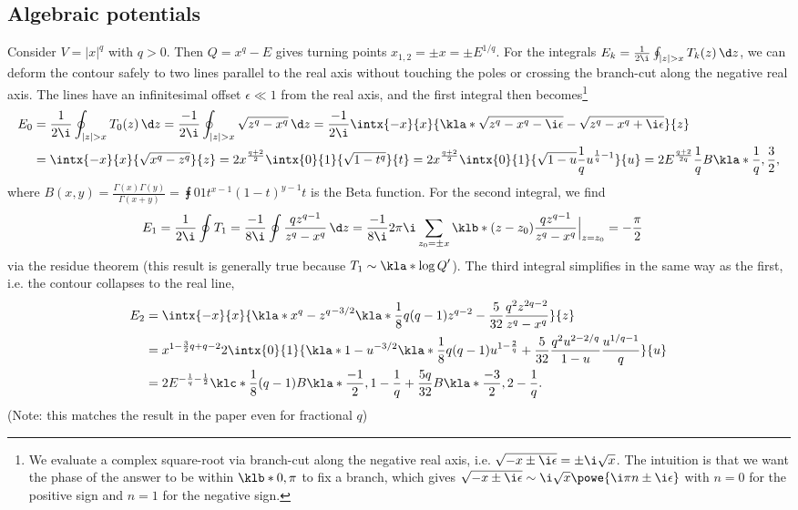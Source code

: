 \documentclass[english, parskip=full]{scrartcl}
\begin{document}
\subsection{Algebraic potentials}
Consider $V=|x|^q$ with $q>0$.
Then $Q=x^q-E$ gives turning points $x_{1,2} = \pm x = \pm E^{1/q}$.
For the integrals $E_k = \frac{1}{2\i} \oint_{|z|>x} T_k(z)\,\d z$, we can deform the contour safely to two lines parallel to the real axis without touching the poles or crossing the branch-cut along the negative real axis.
The lines have an infinitesimal offset $\epsilon \ll 1$ from the real axis, and the first integral then becomes\footnote{We evaluate a complex square-root via branch-cut along the negative real axis, i.e. $\sqrt{-x \pm \i\epsilon} = \pm\i \sqrt{x}$. The intuition is that we want the phase of the answer to be within $\klb*{0,\pi}$ to fix a branch, which gives $\sqrt{-x\pm\i\epsilon} \sim \i\sqrt{x} \powe{\i\pi n \pm \i\epsilon}$ with $n=0$ for the positive sign and $n=1$ for the negative sign.}
\begin{align}
E_0 &= \frac{1}{2\i} \oint_{|z| > x} T_0(z)\,\d z = \frac{-1}{2\i} \oint_{|z| > x} \sqrt{z^q-x^q}\,\d z = \frac{-1}{2\i} \intx{-x}{x}{\kla*{\sqrt{z^q - x^q - \i\epsilon} - \sqrt{z^q - x^q + \i\epsilon}}}{z}\\
&= \intx{-x}{x}{\sqrt{x^q - z^q}}{z} = 2x^{\frac{q+2}{2}} \intx{0}{1}{\sqrt{1 - t^q}}{t} = 2x^{\frac{q+2}{2}} \intx{0}{1}{\sqrt{1 - u} \frac{1}{q} u^{\frac{1}{q}-1}}{u} = 2E^{\frac{q+2}{2q}} \frac{1}{q} B\kla*{\frac{1}{q},\frac{3}{2}},
\end{align}
where $B(x,y)=\frac{\Gamma(x)\Gamma(y)}{\Gamma(x+y)} = \intx{0}{1}{t^{x-1}(1-t)^{y-1}}{t}$ is the Beta function.
For the second integral, we find
\begin{align}
E_1 &= \frac{1}{2\i} \oint T_1 = \frac{-1}{8\i} \oint \frac{qz^{q-1}}{z^q-x^q}\,\d z = \frac{-1}{8\i} 2\pi\i \sum_{z_0=\pm x} \klb*{(z-z_0)\frac{qz^{q-1}}{z^q-x^q}}\Big\vert_{z=z_0} = -\frac{\pi}{2}
\end{align}
via the residue theorem (this result is generally true because $T_1\sim\kla*{\log Q}'$).
The third integral simplifies in the same way as the first, i.e. the contour collapses to the real line,
\begin{align}
E_2 &= \intx{-x}{x}{\kla*{x^q-z^q}^{-3/2} \kla*{\frac{1}{8} q(q-1)z^{q-2} - \frac{5}{32} \frac{q^2z^{2q-2}}{z^q-x^q}}}{z}\\
&= x^{1 - \frac{3}{2}q + q-2} 2\intx{0}{1}{\kla*{1-u}^{-3/2} \kla*{\frac{1}{8} q(q-1)u^{1-\frac{2}{q}} + \frac{5}{32} \frac{q^2 u^{2-2/q}}{1-u}} \frac{u^{1/q-1}}{q} }{u}\\
&= 2E^{-\frac{1}{q}-\frac{1}{2}} \klc*{\frac{1}{8} (q-1)B\kla*{\frac{-1}{2}, 1 - \frac{1}{q}} + \frac{5q}{32} B\kla*{\frac{-3}{2},2-\frac{1}{q}}}.
\end{align}
(Note: this matches the result in the paper even for fractional $q$)
\end{document}
